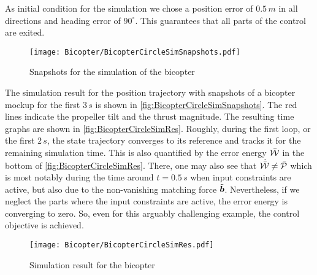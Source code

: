 As initial condition for the simulation we chose a position error of $0.5\,\unit{m}$ in all directions and heading error of $90^\circ$. 
This guarantees that all parts of the control are exited.

\begin{figure}[t]
 \centering
 \texttt{[image: Bicopter/BicopterCircleSimSnapshots.pdf]}
 \caption{Snapshots for the simulation of the bicopter}
 \label{fig:BicopterCircleSimSnapshots}
\end{figure}

The simulation result for the position trajectory with snapshots of a bicopter mockup for the first $3\,\unit{s}$ is shown in \autoref{fig:BicopterCircleSimSnapshots}.
The red lines indicate the propeller tilt and the thrust magnitude.
The resulting time graphs are shown in \autoref{fig:BicopterCircleSimRes}.
Roughly, during the first loop, or the first $2\,\unit{s}$, the state trajectory converges to its reference and tracks it for the remaining simulation time.
This is also quantified by the error energy $\bar{\mathcal{W}}$ in the bottom of \autoref{fig:BicopterCircleSimRes}.
There, one may also see that $\dot{\bar{\mathcal{W}}} \neq \bar{\mathcal{P}}$ which is most notably during the time around $t=0.5\,\unit{s}$ when input constraints are active, but also due to the non-vanishing matching force $\tilde{\boldsymbol{b}}$.
Nevertheless, if we neglect the parts where the input constraints are active, the error energy is converging to zero.
So, even for this arguably challenging example, the control objective is achieved.

\begin{figure}[p]
 \centering
 \texttt{[image: Bicopter/BicopterCircleSimRes.pdf]}
 \caption{Simulation result for the bicopter}
 \label{fig:BicopterCircleSimRes}
\end{figure}
